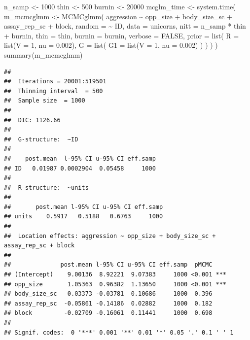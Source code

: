 \documentclass[
  12pt,
]{book}
\newenvironment{Shaded}{\begin{snugshade}}{\end{snugshade}}
\newcommand{\AttributeTok}[1]{\textcolor[rgb]{0.77,0.63,0.00}{#1}}
\newcommand{\ConstantTok}[1]{\textcolor[rgb]{0.00,0.00,0.00}{#1}}
\newcommand{\DecValTok}[1]{\textcolor[rgb]{0.00,0.00,0.81}{#1}}
\newcommand{\FloatTok}[1]{\textcolor[rgb]{0.00,0.00,0.81}{#1}}
\newcommand{\FunctionTok}[1]{\textcolor[rgb]{0.00,0.00,0.00}{#1}}
\newcommand{\NormalTok}[1]{#1}
\newcommand{\OtherTok}[1]{\textcolor[rgb]{0.56,0.35,0.01}{#1}}
\newcommand{\SpecialCharTok}[1]{\textcolor[rgb]{0.00,0.00,0.00}{#1}}
\begin{document}
\begin{Shaded}
\begin{Highlighting}[]
\NormalTok{n\_samp }\OtherTok{\textless{}{-}} \DecValTok{1000}
\NormalTok{thin }\OtherTok{\textless{}{-}} \DecValTok{500}
\NormalTok{burnin }\OtherTok{\textless{}{-}} \DecValTok{20000}
\NormalTok{mcglm\_time }\OtherTok{\textless{}{-}} \FunctionTok{system.time}\NormalTok{(}
\NormalTok{  m\_mcmcglmm }\OtherTok{\textless{}{-}} \FunctionTok{MCMCglmm}\NormalTok{(}
\NormalTok{    aggression }\SpecialCharTok{\textasciitilde{}}\NormalTok{ opp\_size }\SpecialCharTok{+}\NormalTok{ body\_size\_sc }\SpecialCharTok{+}\NormalTok{ assay\_rep\_sc }\SpecialCharTok{+}\NormalTok{ block,}
                \AttributeTok{random =} \SpecialCharTok{\textasciitilde{}}\NormalTok{ ID,}
    \AttributeTok{data =}\NormalTok{ unicorns,}
    \AttributeTok{nitt =}\NormalTok{ n\_samp }\SpecialCharTok{*}\NormalTok{ thin }\SpecialCharTok{+}\NormalTok{ burnin, }\AttributeTok{thin =}\NormalTok{ thin, }\AttributeTok{burnin =}\NormalTok{ burnin,}
    \AttributeTok{verbose =} \ConstantTok{FALSE}\NormalTok{,}
    \AttributeTok{prior =} \FunctionTok{list}\NormalTok{(}
      \AttributeTok{R =} \FunctionTok{list}\NormalTok{(}\AttributeTok{V =} \DecValTok{1}\NormalTok{, }\AttributeTok{nu =} \FloatTok{0.002}\NormalTok{),}
      \AttributeTok{G =} \FunctionTok{list}\NormalTok{(}
        \AttributeTok{G1 =} \FunctionTok{list}\NormalTok{(}\AttributeTok{V =} \DecValTok{1}\NormalTok{, }\AttributeTok{nu =} \FloatTok{0.002}\NormalTok{)}
\NormalTok{      )}
\NormalTok{    )}
\NormalTok{  )}
\NormalTok{)}
\FunctionTok{summary}\NormalTok{(m\_mcmcglmm)}
\end{Highlighting}
\end{Shaded}

\begin{verbatim}
## 
##  Iterations = 20001:519501
##  Thinning interval  = 500
##  Sample size  = 1000 
## 
##  DIC: 1126.66 
## 
##  G-structure:  ~ID
## 
##    post.mean  l-95% CI u-95% CI eff.samp
## ID   0.01987 0.0002904  0.05458     1000
## 
##  R-structure:  ~units
## 
##       post.mean l-95% CI u-95% CI eff.samp
## units    0.5917   0.5188   0.6763     1000
## 
##  Location effects: aggression ~ opp_size + body_size_sc + assay_rep_sc + block 
## 
##              post.mean l-95% CI u-95% CI eff.samp  pMCMC    
## (Intercept)    9.00136  8.92221  9.07383     1000 <0.001 ***
## opp_size       1.05363  0.96382  1.13650     1000 <0.001 ***
## body_size_sc   0.03373 -0.03781  0.10686     1000  0.396    
## assay_rep_sc  -0.05861 -0.14186  0.02882     1000  0.182    
## block         -0.02709 -0.16061  0.11441     1000  0.698    
## ---
## Signif. codes:  0 '***' 0.001 '**' 0.01 '*' 0.05 '.' 0.1 ' ' 1
\end{verbatim}
\end{document}
